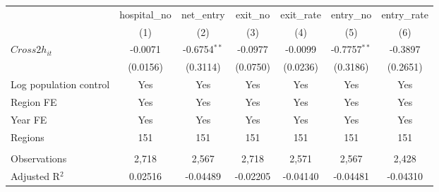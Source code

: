 \begingroup
\centering
\begin{tabular}{lcccccc}
   \toprule
                          & hospital\_no  & net\_entry     & exit\_no  & exit\_rate  & entry\_no      & entry\_rate \\    
                          & (1)           & (2)            & (3)       & (4)         & (5)            & (6)\\  
   \midrule 
   $Cross2h_{it}$         & -0.0071       & -0.6754$^{**}$ & -0.0977   & -0.0099     & -0.7757$^{**}$ & -0.3897\\   
                          & (0.0156)      & (0.3114)       & (0.0750)  & (0.0236)    & (0.3186)       & (0.2651)\\   
   Log population control & Yes           & Yes            & Yes       & Yes         & Yes            & Yes\\  
   Region FE              & Yes           & Yes            & Yes       & Yes         & Yes            & Yes\\  
   Year FE                & Yes           & Yes            & Yes       & Yes         & Yes            & Yes\\  
   Regions                & 151           & 151            & 151       & 151         & 151            & 151\\  
    \\
   Observations           & 2,718         & 2,567          & 2,718     & 2,571       & 2,567          & 2,428\\  
   Adjusted R$^2$         & 0.02516       & -0.04489       & -0.02205  & -0.04140    & -0.04481       & -0.04310\\  
   \bottomrule
\end{tabular}
\par\endgroup
